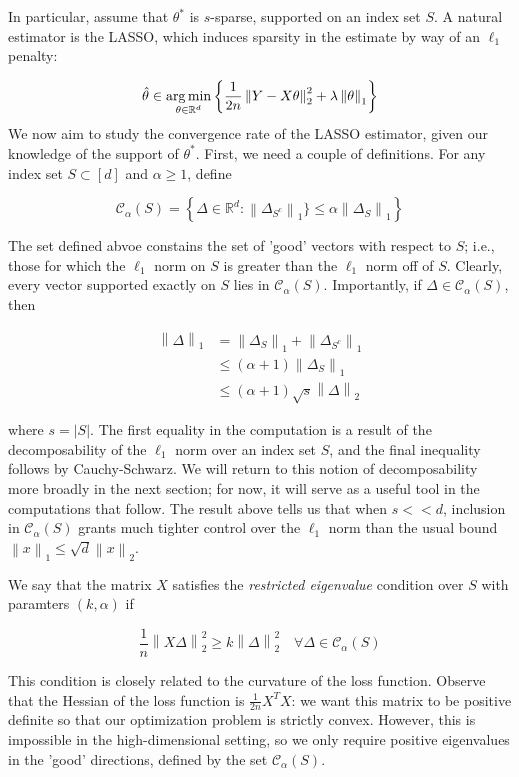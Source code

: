 \documentclass{article}
\newcommand{\R}{\mathbb{R}}
\newcommand{\cC}{\mathcal{C}}
\newcommand{\argmin}{\mathop{\rm arg\,min}}
\newcommand{\norm}[1]{\left\|#1\right\|}
\begin{document}
In particular, assume that $\theta^{*}$ is $s$-sparse, supported on an index set $S$. A natural estimator is the LASSO, which induces sparsity in the estimate by way of an $\ell_{1}$ penalty:

$$\hat{\theta} \in \argmin_{\theta \in \R^{d}}\left\{\frac{1}{2n}\norm{Y - X\theta}^{2}_{2} + \lambda \norm{\theta}_{1}\right\}$$
We now aim to study the convergence rate of the LASSO estimator, given our knowledge of the support of $\theta^{*}$. First, we need a couple of definitions. For any index set $S \subset [d]$ and $\alpha \geq 1$, define

$$\cC_{\alpha}(S) = \left\{ \Delta \in \R^{d} : \norm{\Delta_{S^{c}}}_{1}\} \leq \alpha \norm{\Delta_{S}}_{1}\right\}$$

The set defined abvoe constains the set of 'good' vectors with respect to $S$; i.e., those for which the $\ell_{1}$ norm on $S$ is greater than the $\ell_{1}$ norm off of $S$. Clearly, every vector supported exactly on $S$ lies in $\cC_{\alpha}(S)$. Importantly, if $\Delta \in \cC_{\alpha}(S)$, then

\begin{align*}
  \norm{\Delta}_{1}
  &= \norm{\Delta_{S}}_{1} + \norm{\Delta_{S^{c}}}_{1} \\
  &\leq (\alpha + 1)\norm{\Delta_{S}}_{1} \\
  &\leq (\alpha + 1)\sqrt{s}\norm{\Delta}_{2}
\end{align*}

where $s = |S|$. The first equality in the computation is a result of the decomposability of the $\ell_{1}$ norm over an index set $S$, and the final inequality follows by Cauchy-Schwarz. We will return to this notion of  decomposability more broadly in the next section; for now, it will serve as a useful tool in the computations that follow. The result above tells us that when $s << d$, inclusion in $\cC_{\alpha}(S)$ grants much tighter control over the $\ell_{1}$ norm than the usual bound $\norm{x}_{1} \leq \sqrt{d}\norm{x}_{2}$.

We say that the matrix $X$ satisfies the \textit{restricted eigenvalue} condition over $S$ with paramters $(k, \alpha)$ if

$$\frac1n\norm{X\Delta}_{2}^{2} \geq k\norm{\Delta}_{2}^{2} \quad \forall \Delta \in \cC_{\alpha}(S)$$

This condition is closely related to the curvature of the loss function. Observe that the Hessian of the loss function is $\frac{1}{2n} X^{T}X$: we want this matrix to be positive definite so that our optimization problem is strictly convex. However, this is impossible in the high-dimensional setting, so we only require positive eigenvalues in the 'good' directions, defined by the set $\cC_{\alpha}(S)$.
\end{document}
